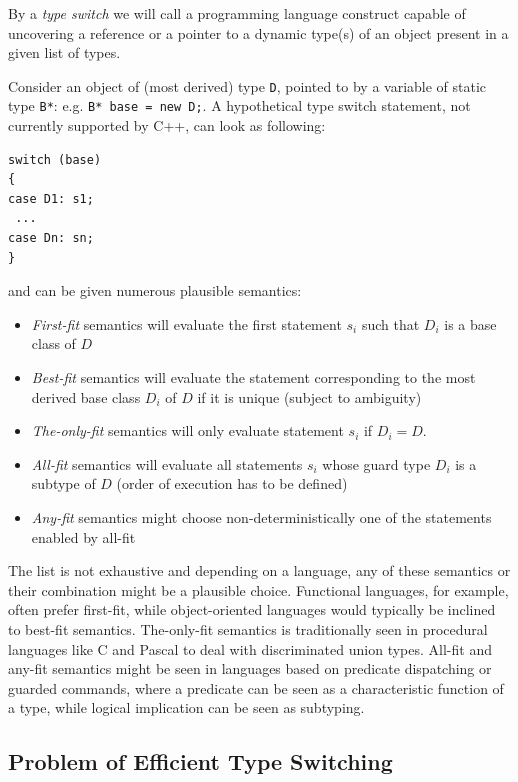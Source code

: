 \documentclass[preprint]{sigplanconf}
\makeatletter
\DeclareRobustCommand{\code}[1]{{\lstinline[breaklines=false,escapechar=@]{#1}}}
\makeatother
\begin{document}
By a \emph{type switch} we will call a programming language construct capable of 
uncovering a reference or a pointer to a dynamic type(s) of an object present in 
a given list of types.

Consider an object of (most derived) type \code{D}, pointed to by a variable of 
static type \code{B*}: e.g. \code{B* base = new D;}. A hypothetical type switch 
statement, not currently supported by C++, can look as following:

\begin{lstlisting}
switch (base)
{
case D1: s1;
 ...
case Dn: sn;
}
\end{lstlisting}

\noindent and can be given numerous plausible semantics:

\begin{itemize}
\setlength{\itemsep}{0pt}
\setlength{\parskip}{0pt}
\item \emph{First-fit} semantics will evaluate the first statement $s_i$ such 
      that $D_i$ is a base class of $D$
\item \emph{Best-fit} semantics will evaluate the statement corresponding to the 
      most derived base class $D_i$ of $D$ if it is unique (subject to 
      ambiguity)
\item \emph{The-only-fit} semantics will only evaluate statement $s_i$ if $D_i=D$.
\item \emph{All-fit} semantics will evaluate all statements $s_i$ whose guard 
      type $D_i$ is a subtype of $D$ (order of execution has to be defined)
\item \emph{Any-fit} semantics might choose non-deterministically one of the 
      statements enabled by all-fit
\end{itemize}

\noindent
The list is not exhaustive and depending on a language, any of these semantics 
or their combination might be a plausible choice. Functional languages, for 
example, often prefer first-fit, while object-oriented languages would typically 
be inclined to best-fit semantics. The-only-fit semantics is traditionally seen 
in procedural languages like C and Pascal to deal with discriminated union types. 
All-fit and any-fit semantics might be seen in languages based on predicate 
dispatching\cite{ErnstKC98} or guarded commands\cite{EWD:EWD472}, where a 
predicate can be seen as a characteristic function of a type, while logical 
implication can be seen as subtyping.

\subsection{Problem of Efficient Type Switching}
\label{sec:poets}
\end{document}
